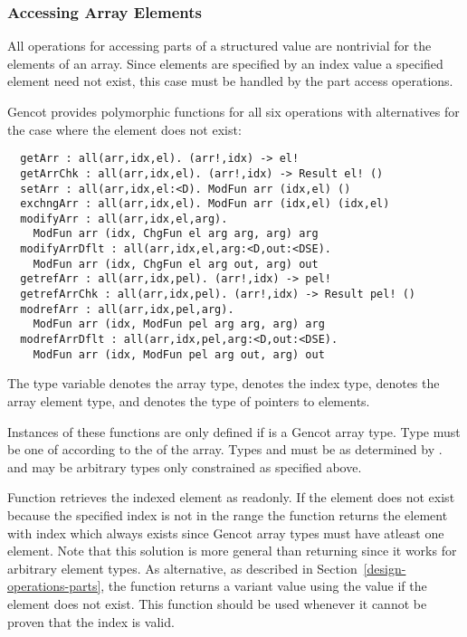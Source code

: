 \subsubsection{Accessing Array Elements}

All operations for accessing parts of a structured value are nontrivial for the elements of an array. Since elements are 
specified by an index value a specified element need not exist, this case must be handled by the part access operations.

Gencot provides polymorphic functions for all six operations with alternatives for the case where the element does not 
exist:
\begin{verbatim}
  getArr : all(arr,idx,el). (arr!,idx) -> el!
  getArrChk : all(arr,idx,el). (arr!,idx) -> Result el! ()
  setArr : all(arr,idx,el:<D). ModFun arr (idx,el) ()
  exchngArr : all(arr,idx,el). ModFun arr (idx,el) (idx,el)
  modifyArr : all(arr,idx,el,arg). 
    ModFun arr (idx, ChgFun el arg arg, arg) arg
  modifyArrDflt : all(arr,idx,el,arg:<D,out:<DSE). 
    ModFun arr (idx, ChgFun el arg out, arg) out
  getrefArr : all(arr,idx,pel). (arr!,idx) -> pel!
  getrefArrChk : all(arr,idx,pel). (arr!,idx) -> Result pel! ()
  modrefArr : all(arr,idx,pel,arg). 
    ModFun arr (idx, ModFun pel arg arg, arg) arg
  modrefArrDflt : all(arr,idx,pel,arg:<D,out:<DSE). 
    ModFun arr (idx, ModFun pel arg out, arg) out
\end{verbatim}
The type variable  denotes the array type,  denotes the index type,
 denotes the array element type, and  denotes the type of pointers to elements. 

Instances of these functions are only defined if  is a Gencot array type. Type 
must be one of  according to the  of the array. Types  and
 must be as determined by .  and  may be arbitrary types
only constrained as specified above.

Function  retrieves the indexed element as readonly. If the element does not exist because
the specified index is not in the range  the function returns the element with 
index  which always exists since Gencot array types must have atleast one element. Note that
this solution is more general than returning  since it works for arbitrary element types.
As alternative, as described in Section~\ref{design-operations-parts}, the function
 returns a variant value using the value  if the element does not exist.
This function should be used whenever it cannot be proven that the index is valid.

